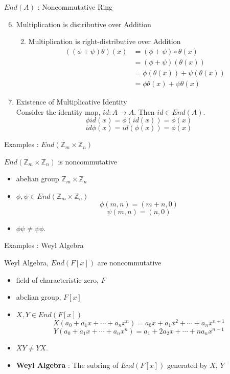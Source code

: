 \documentclass{beamer}
\begin{document}
\begin{frame}{$End(A)$ : Noncommutative Ring}
\begin{enumerate}
	\setcounter{enumi}{5}
	\item Multiplication is distributive over Addition
	\begin{enumerate}
		\setcounter{enumii}{1}
		\item Multiplication is right-distributive over Addition
		\begin{align*}
			((\phi+\psi)\theta)(x) & = (\phi+\psi) \circ \theta(x) \\ 
			& = (\phi+\psi)(\theta(x)) \\
			& = \phi(\theta(x)) + \psi(\theta(x)) \\
			& = \phi\theta(x) + \psi\theta(x) 
		\end{align*}
	\end{enumerate}
	\item Existence of Multiplicative Identity\\
	Consider the identity map, $id : A \to A$. Then $id \in End(A)$.
	\[ \phi id(x) = \phi(id(x)) = \phi(x) \]
	\[ id \phi(x) = id(\phi(x)) = \phi(x) \]
\end{enumerate}
\end{frame}

\begin{frame}{Examples : $End(\mathbb{Z}_m \times \mathbb{Z}_n)$}
\begin{exampleblock}{$End(\mathbb{Z}_m \times \mathbb{Z}_n)$ is noncommutative}
\begin{itemize}
	\item abelian group $\mathbb{Z}_m \times \mathbb{Z}_n$
	\item $\phi,\psi \in End(\mathbb{Z}_m \times \mathbb{Z}_n)$
		\[ \phi(m,n) = (m+n,0) \] 
		\[ \psi(m,n) = (n,0) \]
	\item \alert{$\phi\psi\ne \psi\phi$.}
	\end{itemize}
\end{exampleblock}
\end{frame}

\begin{frame}{Examples : Weyl Algebra}
\begin{exampleblock}{Weyl Algebra, $End(F[x])$ are noncommutative}
\begin{itemize}
	\item field of characteristic zero, $F$\\
	\item abelian group, $F[x]$
	\item $X,Y \in End(F[x])$
	\[ X(a_0+a_1x+\cdots+a_nx^n) = a_0x+a_1x^2+\cdots+a_nx^{n+1} \]
	\[ Y(a_0+a_1x+\cdots+a_nx^n) = a_1+2a_2x+\cdots+na_nx^{n-1} \]
	\item \alert{$XY \ne YX$.}
	\item \textbf{Weyl Algebra} : The subring of $End(F[x])$ generated by $X$, $Y$
\end{itemize}
\end{exampleblock}
\end{frame}
\end{document}
